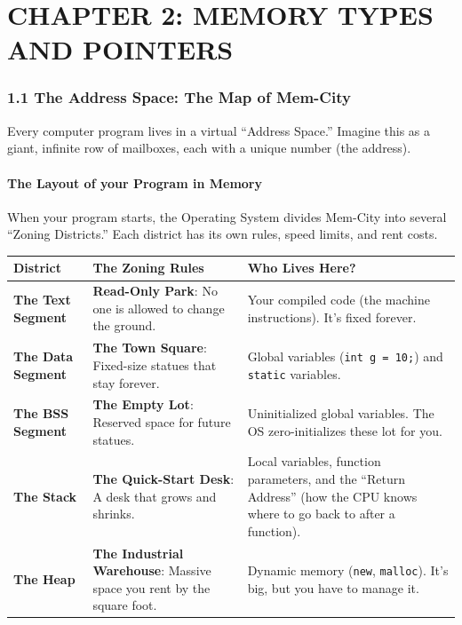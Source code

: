 \hypertarget{chapter-2-memory-types-and-pointers}{%
\section{CHAPTER 2: MEMORY TYPES AND
POINTERS}\label{chapter-2-memory-types-and-pointers}}

\hypertarget{the-address-space-the-map-of-mem-city}{%
\subsubsection{1.1 The Address Space: The Map of
Mem-City}\label{the-address-space-the-map-of-mem-city}}

Every computer program lives in a virtual ``Address Space.'' Imagine
this as a giant, infinite row of mailboxes, each with a unique number
(the address).

\hypertarget{the-layout-of-your-program-in-memory}{%
\paragraph{The Layout of your Program in
Memory}\label{the-layout-of-your-program-in-memory}}

When your program starts, the Operating System divides Mem-City into
several ``Zoning Districts.'' Each district has its own rules, speed
limits, and rent costs.

\begin{longtable}[]{@{}
  >{\raggedright\arraybackslash}p{}
  >{\raggedright\arraybackslash}p{}
  >{\raggedright\arraybackslash}p{}@{}}
\toprule
District & The Zoning Rules & Who Lives Here? \\
\midrule
\endhead
\textbf{The Text Segment} & \textbf{Read-Only Park}: No one is allowed
to change the ground. & Your compiled code (the machine instructions).
It's fixed forever. \\
\textbf{The Data Segment} & \textbf{The Town Square}: Fixed-size statues
that stay forever. & Global variables
(\passthrough{\lstinline!int g = 10;!}) and
\passthrough{\lstinline!static!} variables. \\
\textbf{The BSS Segment} & \textbf{The Empty Lot}: Reserved space for
future statues. & Uninitialized global variables. The OS
zero-initializes these lot for you. \\
\textbf{The Stack} & \textbf{The Quick-Start Desk}: A desk that grows
and shrinks. & Local variables, function parameters, and the ``Return
Address'' (how the CPU knows where to go back to after a function). \\
\textbf{The Heap} & \textbf{The Industrial Warehouse}: Massive space you
rent by the square foot. & Dynamic memory
(\passthrough{\lstinline!new!}, \passthrough{\lstinline!malloc!}). It's
big, but you have to manage it. \\
\bottomrule
\end{longtable}

